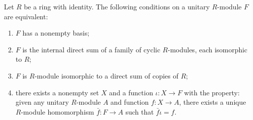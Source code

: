 Let $R$ be a ring with identity. The following conditions on a unitary $R$-module $F$ are equivalent:
\begin{enumerate}
\item[(i)] $F$ has a nonempty basis;
\item[(ii)] $F$ is the internal direct sum of a family of cyclic $R$-modules, each isomorphic to $R$;
\item[(iii)] $F$ is $R$-module isomorphic to a direct sum of copies of $R$;
\item[(iv)] there exists a nonempty set $X$ and a function $\iota: X \to F$ with the property: given any unitary $R$-module $A$ and function $f: X \to A$, there exists a unique $R$-module homomorphism $\bar{f}: F \to A$ such that $\bar{f}\iota = f$.
\end{enumerate}
